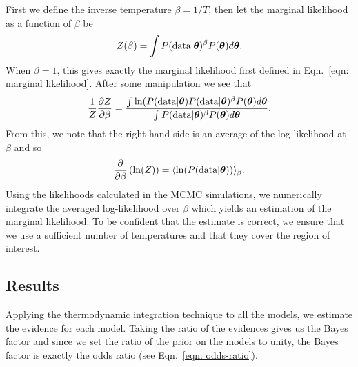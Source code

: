 \documentclass[../full_thesis/full_thesis.tex]{subfiles}
\begin{document}
First we define the inverse temperature $\beta = 1/T$, then let the marginal
likelihood as a function of $\beta$ be
\begin{equation}
Z(\beta) = \int P(\textrm{data}| \boldsymbol{\theta})^{\beta}P(\boldsymbol{\theta}) d\boldsymbol{\theta}.
\end{equation}
When $\beta=1$, this gives exactly the marginal likelihood first defined in
Eqn.~\eqref{eqn: marginal likelihood}.
After some manipulation we see that
\begin{equation}
\frac{1}{Z} \frac{\partial Z}{\partial \beta} =
\frac{
\int \ln(P(\textrm{data}| \boldsymbol{\theta}) P(\textrm{data}| \boldsymbol{\theta})^{\beta}P(\boldsymbol{\theta}) d\boldsymbol{\theta}}
{\int P(\textrm{data}| \boldsymbol{\theta})^{\beta}P(\boldsymbol{\theta}) d\boldsymbol{\theta}}.
\end{equation}
From this, we note that the right-hand-side is an average of the log-likelihood
at $\beta$ and so
\begin{equation}
\frac{\partial}{\partial\beta}\left(\ln(Z)\right) =
\langle \ln(P(\textrm{data}| \boldsymbol{\theta}))\rangle_\beta.
\end{equation}
Using the likelihoods calculated in the MCMC simulations, we numerically
integrate the averaged log-likelihood over $\beta$ which yields an estimation
of the marginal likelihood. To be confident that the estimate is correct, we
ensure that we use a sufficient number of temperatures and that they cover the
region of interest.

\subsection{Results}
Applying the thermodynamic integration technique to all the models, we estimate
the evidence for each model. Taking the ratio of the evidences gives us the
Bayes factor and since we set the ratio of the prior on the models to unity,
the Bayes factor is exactly the odds ratio (see Eqn.~\eqref{eqn: odds-ratio}).
\end{document}
